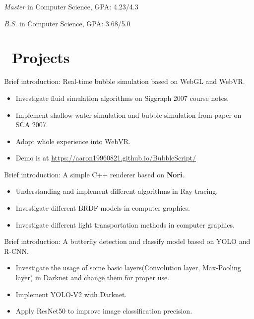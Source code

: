 \documentclass{resume}
\begin{document}



\textit{Master} in Computer Science, GPA: 4.23/4.3

\textit{B.S.} in Computer Science, GPA: 3.68/5.0

\section{\faUsers\ Projects}

Brief introduction: Real-time bubble simulation based on WebGL and WebVR.
\begin{itemize}
    \item Investigate fluid simulation algorithms on Siggraph 2007 course notes.
    \item Implement shallow water simulation and bubble simulation from paper on SCA 2007.
    \item Adopt whole experience into WebVR.
    \item Demo is at \url{https://aaron19960821.github.io/BubbleScript/}
\end{itemize}

Brief introduction: A simple C++ renderer based on \textbf{Nori}.
\begin{itemize}
    \item Understanding and implement different algorithms in Ray tracing.
    \item Investigate different BRDF models in computer graphics.
    \item Investigate different light transportation methods in computer graphics.
\end{itemize}

Brief introduction: A butterfly detection and classify model based on YOLO and R-CNN.
\begin{itemize}
	\item Investigate the usage of some basic layers(Convolution layer, Max-Pooling layer) in Darknet and change them for proper use.
  \item Implement YOLO-V2 with Darknet.
	\item Apply ResNet50 to improve image classification precision.
\end{itemize}
\end{document}
